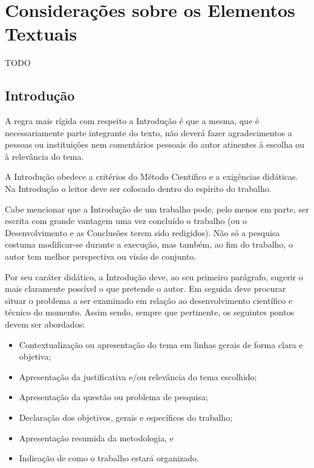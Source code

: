 \chapter[Considerações sobre os Elementos Textuais]{Considerações sobre os
Elementos Textuais}

TODO

\section{Introdução}

A regra mais rígida com respeito a Introdução é que a mesma, que é
necessariamente parte integrante do texto, não deverá fazer agradecimentos
a pessoas ou instituições nem comentários pessoais do autor atinentes à
escolha ou à relevância do tema.

A Introdução obedece a critérios do Método Cientifico e a exigências
didáticas. Na Introdução o leitor deve ser colocado dentro do espírito do
trabalho.

Cabe mencionar que a Introdução de um trabalho pode, pelo menos em parte,
ser escrita com grande vantagem uma vez concluído o trabalho (ou o
Desenvolvimento e as Conclusões terem sido redigidos). Não só a pesquisa
costuma modificar-se durante a execução, mas também, ao fim do trabalho, o
autor tem melhor perspectiva ou visão de conjunto.

Por seu caráter didático, a Introdução deve, ao seu primeiro parágrafo,
sugerir o mais claramente possível o que pretende o autor. Em seguida deve
procurar situar o problema a ser examinado em relação ao desenvolvimento
científico e técnico do momento. Assim sendo, sempre que pertinente, os
seguintes pontos devem ser abordados:

\begin{itemize}

	\item Contextualização ou apresentação do tema em linhas gerais de
	forma clara e objetiva;
	\item Apresentação da justificativa e/ou relevância do tema escolhido;
	\item Apresentação da questão ou problema de pesquisa;
	\item Declaração dos objetivos, gerais e específicos do trabalho;
	\item Apresentação resumida da metodologia, e
	\item Indicação de como o trabalho estará organizado.

\end{itemize}

